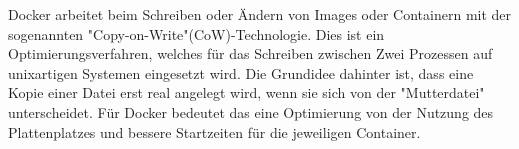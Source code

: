 Docker arbeitet beim Schreiben oder Ändern von Images oder Containern mit der sogenannten "Copy-on-Write"(CoW)-Technologie. Dies ist ein Optimierungsverfahren, welches für das Schreiben zwischen Zwei Prozessen auf unixartigen Systemen eingesetzt wird. Die Grundidee dahinter ist, dass eine Kopie einer Datei erst real angelegt wird, wenn sie sich von der "Mutterdatei" unterscheidet. Für Docker bedeutet das eine Optimierung von der Nutzung des Plattenplatzes und bessere Startzeiten für die jeweiligen Container. \cite{LxcVsDocker}
